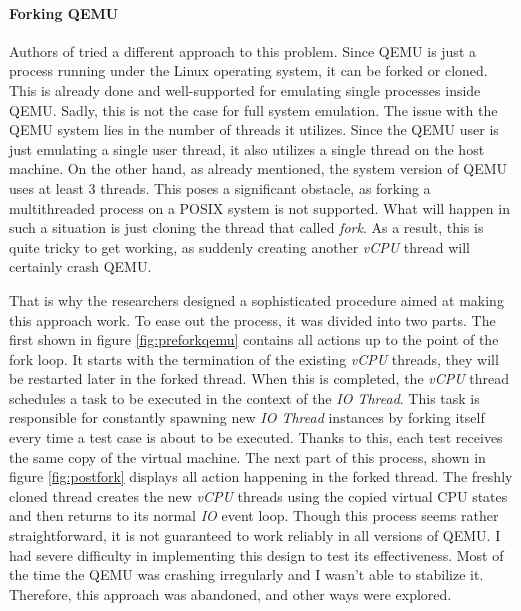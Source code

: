 \paragraph{Forking QEMU}
Authors of \cite{triforceafl} tried a different approach to this problem. Since QEMU is just a process running under the Linux operating system, it can be forked or cloned. This is already done and well-supported for emulating single processes inside QEMU. Sadly, this is not the case for full system emulation. The issue with the QEMU system lies in the number of threads it utilizes. Since the QEMU user is just emulating a single user thread, it also utilizes a single thread on the host machine. On the other hand, as already mentioned, the system version of QEMU uses at least 3 threads. This poses a significant obstacle, as forking a multithreaded process on a POSIX system is not supported. What will happen in such a situation is just cloning the thread that called \textit{fork}. As a result, this is quite tricky to get working, as suddenly creating another \textit{vCPU} thread will certainly crash QEMU.

That is why the researchers designed a sophisticated procedure aimed at making this approach work. To ease out the process, it was divided into two parts. The first shown in figure \ref{fig:preforkqemu} contains all actions up to the point of the fork loop. It starts with the termination of the existing \textit{vCPU} threads, they will be restarted later in the forked thread. When this is completed, the \textit{vCPU} thread schedules a task to be executed in the context of the \textit{IO Thread}. This task is responsible for constantly spawning new \textit{IO Thread} instances by forking itself every time a test case is about to be executed. Thanks to this, each test receives the same copy of the virtual machine. The next part of this process, shown in figure \ref{fig:postfork} displays all action happening in the forked thread. The freshly cloned thread creates the new \textit{vCPU} threads using the copied virtual CPU states and then returns to its normal \textit{IO} event loop. Though this process seems rather straightforward, it is not guaranteed to work reliably in all versions of QEMU. I had severe difficulty in implementing this design to test its effectiveness. Most of the time the QEMU was crashing irregularly and I wasn't able to stabilize it. Therefore, this approach was abandoned, and other ways were explored.

